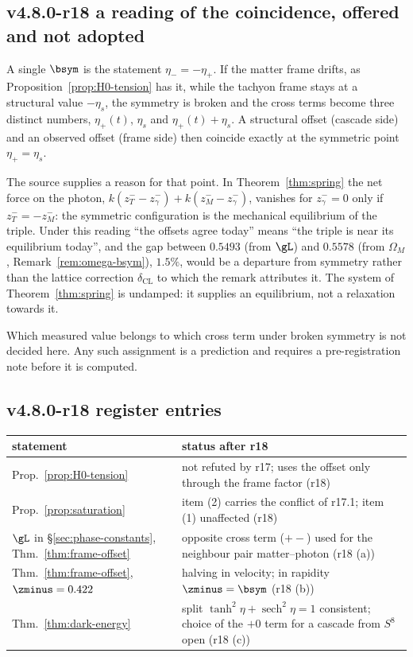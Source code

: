 \subsection*{v4.8.0-r18 a reading of the coincidence, offered and not adopted}
\label{subsec:v480-r18-reading}

A single \(\bsym\) is the statement \(\eta_-=-\eta_+\).  If the matter frame drifts, as
Proposition~\ref{prop:H0-tension} has it, while the tachyon frame stays at a structural value \(-\eta_s\), the symmetry
is broken and the cross terms become three distinct numbers, \(\eta_+(t)\), \(\eta_s\) and \(\eta_+(t)+\eta_s\).
A structural offset (cascade side) and an observed offset (frame side) then coincide exactly at the symmetric point
\(\eta_+=\eta_s\).

The source supplies a reason for that point.  In Theorem~\ref{thm:spring} the net force on the photon,
\(k(z^-_T-z^-_\gamma)+k(z^-_M-z^-_\gamma)\), vanishes for \(z^-_\gamma=0\) only if \(z^-_T=-z^-_M\): the symmetric
configuration is the mechanical equilibrium of the triple.  Under this reading ``the offsets agree today'' means
``the triple is near its equilibrium today'', and the gap between \(0.5493\) (from \(\gL\)) and \(0.5578\) (from
\(\Omega_M\), Remark~\ref{rem:omega-bsym}), \(1.5\%\), would be a departure from symmetry rather than the lattice
correction \(\delta_{\mathrm{CL}}\) to which the remark attributes it.  The system of Theorem~\ref{thm:spring} is
undamped: it supplies an equilibrium, not a relaxation towards it.

Which measured value belongs to which cross term under broken symmetry is not decided here.  Any such assignment is a
prediction and requires a pre-registration note before it is computed.

\subsection*{v4.8.0-r18 register entries}
\label{subsec:v480-r18-register}

\begin{center}
\small
\begin{tabular}{@{}>{\raggedright\arraybackslash}p{}>{\raggedright\arraybackslash}p{}@{}}
\toprule
statement & status after r18\\
\midrule
Prop.~\ref{prop:H0-tension} & not refuted by r17; uses the offset only through the frame factor (r18)\\
Prop.~\ref{prop:saturation} & item (2) carries the conflict of r17.1; item (1) unaffected (r18)\\
\(\gL\) in \S\ref{sec:phase-constants}, Thm.~\ref{thm:frame-offset} & opposite cross term (\(+-\)) used for the neighbour pair matter--photon (r18 (a))\\
Thm.~\ref{thm:frame-offset}, \(\zminus=0.422\) & halving in velocity; in rapidity \(\zminus=\bsym\) (r18 (b))\\
Thm.~\ref{thm:dark-energy} & split \(\tanh^2\eta+\operatorname{sech}^2\eta=1\) consistent; choice of the \(+0\) term for a cascade from \(S^8\) open (r18 (c))\\
\bottomrule
\end{tabular}
\end{center}

